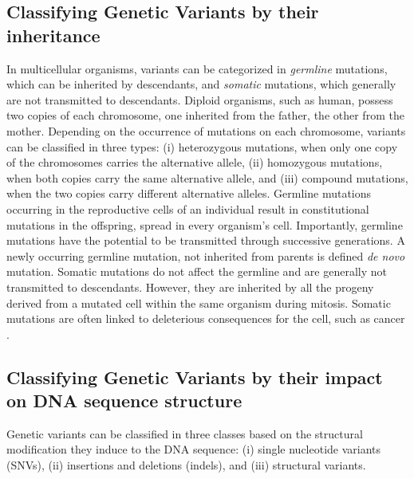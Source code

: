 \documentclass[a4paper, titlepage, openright]{book}
\begin{document}
\subsection{Classifying Genetic Variants by their inheritance}
In multicellular organisms, variants can be categorized in \emph{germline} mutations, which can be inherited by descendants, and \emph{somatic} mutations, which generally are not transmitted to descendants. Diploid organisms, such as human, possess two copies of each chromosome, one inherited from the father, the other from the mother. Depending on the occurrence of mutations on each chromosome, variants can be classified in three types: (i) heterozygous mutations, when only one copy of the chromosomes carries the alternative allele, (ii) homozygous mutations, when both copies carry the same alternative allele, and (iii) compound mutations, when the two copies carry different alternative alleles. Germline mutations occurring in the reproductive cells of an individual result in constitutional mutations in the offspring, spread in every organism's cell. Importantly, germline mutations have the potential to be transmitted through successive generations. A newly occurring germline mutation, not inherited from parents is defined \emph{de novo} mutation. Somatic mutations do not affect the germline and are generally not transmitted to descendants. However, they are inherited by all the progeny derived from a mutated cell within the same organism during mitosis. Somatic mutations are often linked to deleterious consequences for the cell, such as cancer \citep{martincorena2015somatic}. 

\subsection{Classifying Genetic Variants by their impact on DNA sequence structure}
Genetic variants can be classified in three classes based on the structural modification they induce to the DNA sequence: (i) single nucleotide variants (SNVs), (ii) insertions and deletions (indels), and (iii) structural variants.

\end{document}
